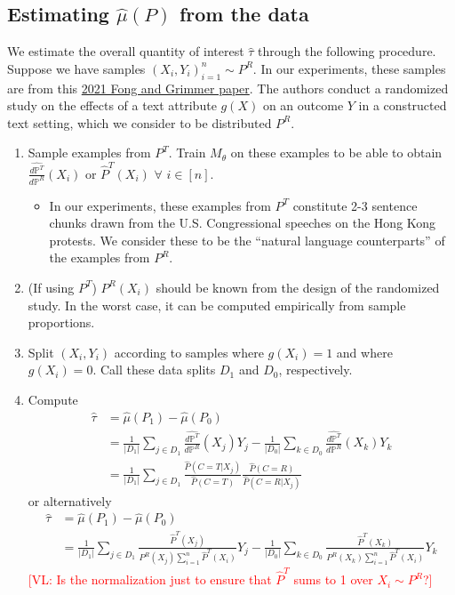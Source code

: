 \documentclass{article}
\newcommand{\vl}[1]{\textcolor{red}{[VL: #1]}}
\begin{document}
\subsection{Estimating $\hat{\mu}(P)$ from the data}

We estimate the overall quantity of interest $\hat{\tau}$ through the following procedure. Suppose we have samples $(X_i,Y_i)_{i=1}^n \sim P^R$. In our experiments, these samples are from this \href{https://onlinelibrary.wiley.com/doi/full/10.1111/ajps.12649}{2021 Fong and Grimmer paper}. The authors conduct a randomized study on the effects of a text attribute $g(X)$ on an outcome $Y$ in a constructed text setting, which we consider to be distributed $P^R$.
\begin{enumerate}
    \item Sample examples from $P^T$. Train $M_\theta$ on these examples to be able to obtain $\frac{\hat{d \mathbb{P}^T}}{d \mathbb{P}^R}(X_i)$ or $\hat{P}^T(X_i)$ $\forall$ $i \in [n]$.
    \begin{itemize}
        \item In our experiments, these examples from $P^T$ constitute 2-3 sentence chunks drawn from the U.S. Congressional speeches on the Hong Kong protests. We consider these to be the ``natural language counterparts'' of the examples from $P^R$.
    \end{itemize}
    \item (If using $P^T$) $P^R(X_i)$ should be known from the design of the randomized study. In the worst case, it can be computed empirically from sample proportions.
    \item Split $(X_i,Y_i)$ according to samples where $g(X_i)=1$ and where $g(X_i)=0$. Call these data splits $D_1$ and $D_0$, respectively.
    \item Compute
    \begin{equation*}
    \begin{split}
        \hat{\tau} &= \hat{\mu}(P_1) - \hat{\mu}(P_0) \\
        &= \frac{1}{|D_1|} \sum_{j \in D_1} \frac{\hat{d \mathbb{P}^T}}{d \mathbb{P}^R}(X_j)Y_j - \frac{1}{|D_0|} \sum_{k \in D_0} \frac{\hat{d \mathbb{P}^T}}{d \mathbb{P}^R}(X_k)Y_k \\
        &= \frac{1}{|D_1|} \sum_{j \in D_1} \frac{\hat{P}(C=T|X_j)}{\hat{P}(C=T)}\frac{\hat{P}(C=R)}{\hat{P}(C=R|X_j)}
    \end{split}
    \end{equation*}
    or alternatively
    \begin{equation*}
    \begin{split}
        \hat{\tau} &= \hat{\mu}(P_1) - \hat{\mu}(P_0) \\
        &= \frac{1}{|D_1|} \sum_{j \in D_1} \frac{\hat{P}^T(X_j)}{P^R(X_j)\sum_{i=1}^n \hat{P}^T(X_i)}Y_j - \frac{1}{|D_0|} \sum_{k \in D_0} \frac{\hat{P}^T(X_k)}{P^R(X_k)\sum_{i=1}^n \hat{P}^T(X_i)}Y_k
    \end{split}
    \end{equation*}
    \vl{Is the normalization just to ensure that $\hat{P}^T$ sums to 1 over $X_i \sim P^R$?}
\end{enumerate}
\end{document}
